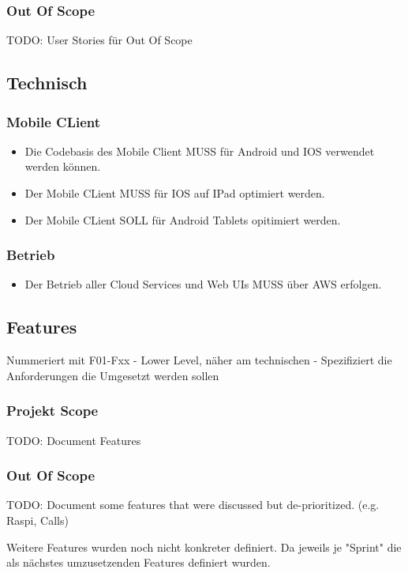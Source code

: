     \subsubsection*{Out Of Scope}

        TODO: User Stories für Out Of Scope

\subsection{Technisch}

    \subsubsection*{Mobile CLient}

        \begin{itemize}
            \item Die Codebasis des Mobile Client MUSS für Android und IOS verwendet werden können.  
            \item Der Mobile CLient MUSS für IOS auf IPad optimiert werden.  
            \item Der Mobile CLient SOLL für Android Tablets opitimiert werden.  
        \end{itemize}

    \subsubsection*{Betrieb}

        \begin{itemize}
            \item Der Betrieb aller Cloud Services und Web UIs MUSS über AWS erfolgen. 
        \end{itemize}

\subsection{Features}

    Nummeriert mit F01-Fxx - Lower Level, näher am technischen - Spezifiziert die Anforderungen die Umgesetzt werden sollen

    \subsubsection*{Projekt Scope}

        TODO: Document Features


    \subsubsection*{Out Of Scope}

        TODO: Document some features that were discussed but de-prioritized. (e.g. Raspi, Calls)
        
        Weitere Features wurden noch nicht konkreter definiert. Da jeweils je "Sprint" die als nächstes umzusetzenden Features definiert wurden. 